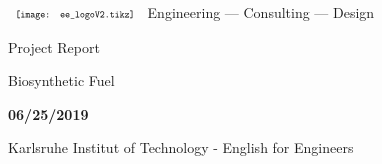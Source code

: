 {
\pagestyle{empty}
  \begin{titlepage}
$
\begin{array}{l}
\resizebox{3cm}{!}{\texttt{[image: ee\_logoV2.tikz]}}
\end{array}
$ {\Large {}Engineering --- Consulting --- Design}

  	\vspace*{3cm} 
  	
  	\begin{center} \large 
  		Project Report
  		\vspace*{2cm}
  		
  		{\huge Biosynthetic Fuel}
  		\vspace*{\fill}
  		
  		\textbf{06/25/2019}

  		\vspace*{1.5cm}
  		
  		Karlsruhe Institut of Technology - English for Engineers
  	\end{center}
  \end{titlepage}
}